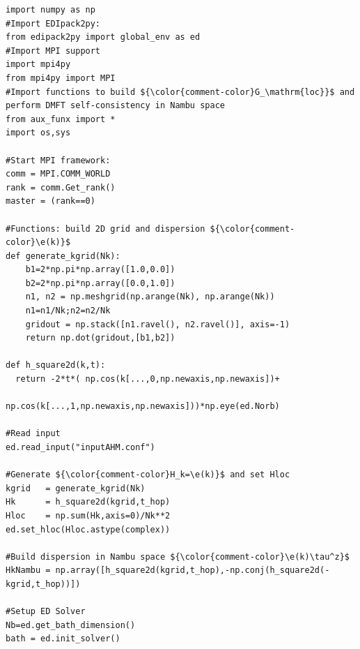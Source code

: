 \documentclass[edipack_sp.tex]{subfiles}
\begin{document}
\begin{lstlisting}[style=mypython,numbers=none,basicstyle={\scriptsize\ttfamily}]
import numpy as np
#Import EDIpack2py:
from edipack2py import global_env as ed
#Import MPI support 
import mpi4py
from mpi4py import MPI
#Import functions to build ${\color{comment-color}G_\mathrm{loc}}$ and perform DMFT self-consistency in Nambu space
from aux_funx import * 
import os,sys

#Start MPI framework:
comm = MPI.COMM_WORLD
rank = comm.Get_rank()
master = (rank==0)

#Functions: build 2D grid and dispersion ${\color{comment-color}\e(k)}$
def generate_kgrid(Nk):
    b1=2*np.pi*np.array([1.0,0.0])
    b2=2*np.pi*np.array([0.0,1.0])
    n1, n2 = np.meshgrid(np.arange(Nk), np.arange(Nk))
    n1=n1/Nk;n2=n2/Nk
    gridout = np.stack([n1.ravel(), n2.ravel()], axis=-1)
    return np.dot(gridout,[b1,b2])
    
def h_square2d(k,t):
  return -2*t*( np.cos(k[...,0,np.newaxis,np.newaxis])+
                np.cos(k[...,1,np.newaxis,np.newaxis]))*np.eye(ed.Norb)
    
#Read input
ed.read_input("inputAHM.conf")

#Generate ${\color{comment-color}H_k=\e(k)}$ and set Hloc
kgrid   = generate_kgrid(Nk)
Hk      = h_square2d(kgrid,t_hop)
Hloc    = np.sum(Hk,axis=0)/Nk**2
ed.set_hloc(Hloc.astype(complex))

#Build dispersion in Nambu space ${\color{comment-color}\e(k)\tau^z}$
HkNambu = np.array([h_square2d(kgrid,t_hop),-np.conj(h_square2d(-kgrid,t_hop))])

#Setup ED Solver
Nb=ed.get_bath_dimension()
bath = ed.init_solver()
\end{lstlisting}
\end{document}
